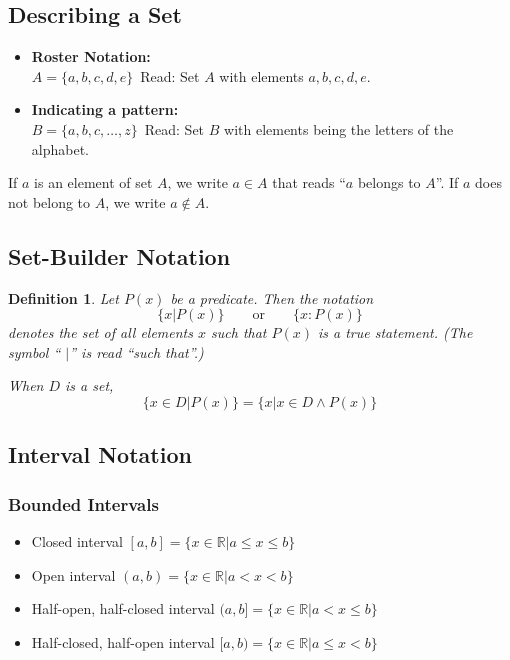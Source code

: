 \documentclass[10pt,reqno]{book}
\theoremstyle{plain}
\newtheorem{definition}[theorem]{Definition}
\def\R{\mathbb{R}}
\begin{document}
	\subsection*{Describing a Set}
	
	\begin{itemize}
		\item \textbf{Roster Notation:}\\
			$ A = \{a,b,c,d,e\} \,$ Read: Set $ A $ with elements $ a,b,c,d,e $.
		\item \textbf{Indicating a pattern:}\\
			$ B = \{a,b,c, \dots , z \} \,$ Read: Set $ B $ with elements being the letters of the alphabet. 
	\end{itemize}
	If $ a $ is an element of set $ A $, we write $ a \in A $ that reads ``$ a $ belongs to $ A $''. If $ a $ does not belong to $ A $, we write $ a \notin A $.
	
	\subsection*{Set-Builder Notation}
	
	\begin{definition}
		Let $ P(x) $ be a predicate. Then the notation
		\[ \{ x | P(x) \} \qquad \text{or} \qquad \{x: P(x)\} \]
		denotes the set of all elements $ x $ such that $ P(x) $ is a true statement. (The symbol `` $ | $'' is read ``such that''.)
		
		When $ D $ is a set,
		\[ \{x \in D | P(x)\} = \{x | x \in D \wedge P(x)\} \]
	\end{definition}
	
	\subsection*{Interval Notation}
	
	\subsubsection*{Bounded Intervals}
	
	\begin{itemize}
		\item Closed interval $ [a,b] = \{x \in \R | a \leq x \leq b\} $
		\item Open interval $ (a,b) = \{x \in \R | a < x < b\} $
		\item Half-open, half-closed interval $ (a,b] = \{x \in \R | a < x \leq b\} $
		\item Half-closed, half-open interval $ [a,b) = \{x \in \R | a \leq x < b\} $
	\end{itemize}
\end{document}
